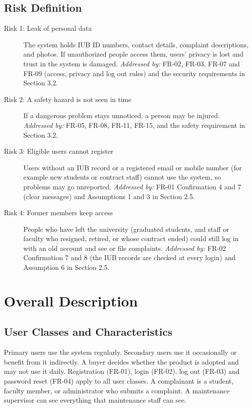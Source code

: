 \section{Risk Definition}
\begin{description}
  \item[Risk 1: Leak of personal data] The system holds IUB ID numbers, contact details, complaint descriptions, and photos. If unauthorized people access them, users' privacy is lost and trust in the system is damaged. \textit{Addressed by:} FR-02, FR-03, FR-07 and FR-09 (access, privacy and log out rules) and the security requirements in Section 3.2.
  \item[Risk 2: A safety hazard is not seen in time] If a dangerous problem stays unnoticed, a person may be injured. \textit{Addressed by:} FR-05, FR-08, FR-11, FR-15, and the safety requirement in Section 3.2.
  \item[Risk 3: Eligible users cannot register] Users without an IUB record or a registered email or mobile number (for example new students or contract staff) cannot use the system, so problems may go unreported. \textit{Addressed by:} FR-01 Confirmation 4 and 7 (clear messages) and Assumptions 1 and 3 in Section 2.5.
  \item[Risk 4: Former members keep access] People who have left the university (graduated students, and staff or faculty who resigned, retired, or whose contract ended) could still log in with an old account and see or file complaints. \textit{Addressed by:} FR-02 Confirmation 7 and 8 (the IUB records are checked at every login) and Assumption 6 in Section 2.5.
\end{description}

\chapter{Overall Description}
\label{Overall Description}

\section{User Classes and Characteristics}
Primary users use the system regularly. Secondary users use it occasionally or benefit from it indirectly. A buyer decides whether the product is adopted and may not use it daily. Registration (FR-01), login (FR-02), log out (FR-03) and password reset (FR-04) apply to all user classes. A complainant is a student, faculty member, or administrator who submits a complaint. A maintenance supervisor can see everything that maintenance staff can see.

